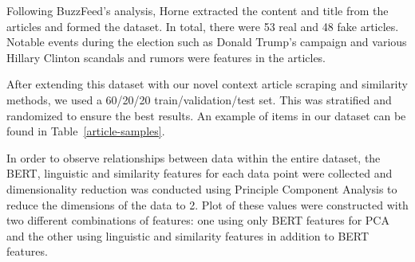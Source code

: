 \documentclass{article}
\begin{document}
Following BuzzFeed's analysis, Horne extracted the content and title from the articles and formed the dataset. In total, there were 53 real and 48 fake articles. Notable events during the election such as Donald Trump's campaign and various Hillary Clinton scandals and rumors were features in the articles.

After extending this dataset with our novel context article scraping and similarity methods, we used a 60/20/20 train/validation/test set. This was stratified and randomized to ensure the best results. An example of items in our dataset can be found in Table~\ref{article-samples}.

\begin{table}
  \begin{center}
  \end{center}
  \caption{A sample of one fake and real article in our dataset. The article ID, title and content are shown in the rows. Both articles are regarding a scandal with Hillary Clinton using a private server to store emails. The fake article reports on an event that never happens whereas the real article reports the true event -- that Clinton was exonerated from criminality.}
  \label{article-samples}
\end{table}


In order to observe relationships between data within the entire dataset, the BERT, linguistic and similarity features for each data point were collected and dimensionality reduction was conducted using Principle Component Analysis to reduce the dimensions of the data to 2. Plot of these values were constructed with two different combinations of features: one using only BERT features for PCA and the other using linguistic and similarity features in addition to BERT features.
\end{document}
